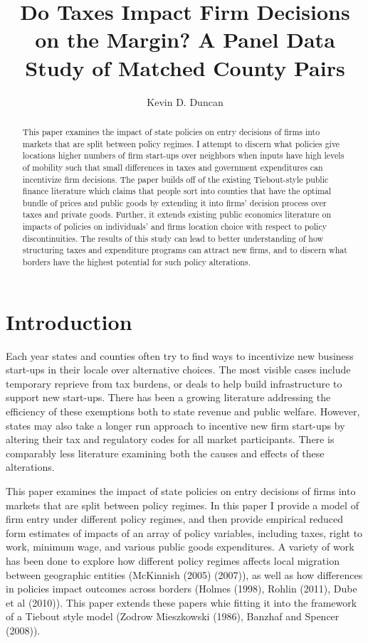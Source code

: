 \documentclass[11pt,a4paper]{article}\usepackage[]{graphicx}\usepackage[]{color}
\begin{document}
\title{Do Taxes Impact Firm Decisions on the Margin? A Panel Data Study of Matched County Pairs}
\author{Kevin D. Duncan}
\maketitle



\begin{abstract}
This paper examines the impact of state policies on entry decisions of firms into markets that are split between policy regimes. I attempt to discern what policies give locations higher numbers of firm start-ups over neighbors when inputs have high levels of mobility such that small differences in taxes and government expenditures can incentivize firm decisions. The paper builds off of the existing Tiebout-style public finance literature which claims that people sort into counties that have the optimal bundle of prices and public goods by extending it into firms' decision process over taxes and private goods. Further, it extends existing public economics literature on impacts of policies on individuals' and firms location choice with respect to policy discontinuities. The results of this study can lead to better understanding of how structuring taxes and expenditure programs can attract new firms, and to discern what borders have the highest potential for such policy alterations.
\end{abstract}

\section{Introduction}

Each year states and counties often try to find ways to incentivize new business start-ups in their locale over alternative choices. The most visible cases include temporary reprieve from tax burdens, or deals to help build infrastructure to support new start-ups. There has been a growing literature addressing the efficiency of these exemptions both to state revenue and public welfare. However, states may also take a longer run approach to incentive new firm start-ups by altering their tax and regulatory codes for all market participants. There is comparably less literature examining both the causes and effects of these alterations.

This paper examines the impact of state policies on entry decisions of firms into markets that are split between policy regimes. In this paper I provide a model of firm entry under different policy regimes, and then provide empirical reduced form estimates of impacts of an array of policy variables, including taxes, right to work, minimum wage, and various public goods expenditures. A variety of work has been done to explore how different policy regimes affects local migration between geographic entities (McKinnish (2005) (2007)), as well as how differences in policies impact outcomes across borders (Holmes (1998), Rohlin (2011), Dube et al (2010)). This paper extends these papers whie fitting it into the framework of a Tiebout style model (Zodrow Mieszkowski (1986), Banzhaf and Spencer (2008)).
\end{document}
